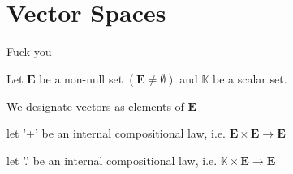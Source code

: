 \documentclass{article}
\begin{document}
\section{Vector Spaces}

Fuck you

Let $\mathbf{E}$ be a non-null set $ (\mathbf{E} \neq \emptyset) $ and $ \mathbb{K}$ be a scalar set.

We designate vectors as elements of $\mathbf{E}$

let '+' be an internal compositional law, i.e. $ \mathbf{E} \times \mathbf{E} \rightarrow \mathbf{E}$

let '.' be an internal compositional law, i.e. $ \mathbb{K} \times \mathbf{E} \rightarrow \mathbf{E}$
\end{document}
